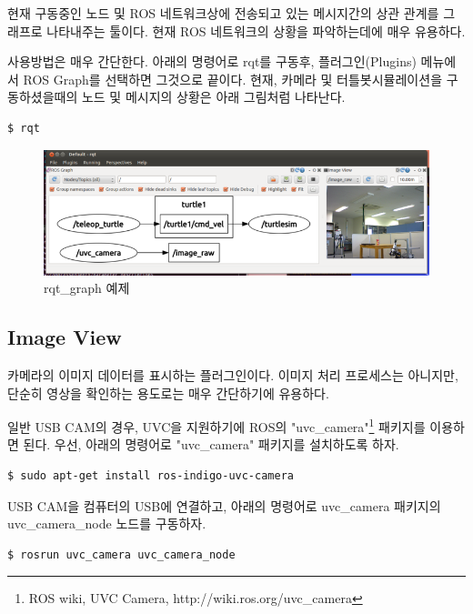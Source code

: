 현재 구동중인 노드 및 ROS 네트워크상에 전송되고 있는 메시지간의 상관 관계를 그래프로 나타내주는 툴이다. 현재 ROS 네트워크의 상황을 파악하는데에 매우 유용하다.

사용방법은 매우 간단한다. 아래의 명령어로 rqt를 구동후, 플러그인(Plugins) 메뉴에서 ROS Graph를 선택하면 그것으로 끝이다. 현재, 카메라 및 터틀봇시뮬레이션을 구동하셨을때의 노드 및 메시지의 상황은 아래 그림처럼 나타난다.

\vspace{\baselineskip}
\begin{lstlisting}[language=ROS]
$ rqt
\end{lstlisting}

\begin{figure}[h]
\centering\includegraphics[width=0.9\columnwidth]{pictures/chapter6/rqt_graph.png}
\caption{rqt\_graph 예제}
\end{figure}

\subsection{Image View}

카메라의 이미지 데이터를 표시하는 플러그인이다. 이미지 처리 프로세스는 아니지만, 단순히 영상을 확인하는 용도로는 매우 간단하기에 유용하다.

일반 USB CAM의 경우, UVC을 지원하기에 ROS의 "uvc\_camera"\footnote{ROS wiki, UVC Camera, http://wiki.ros.org/uvc\_camera} 패키지를 이용하면 된다. 우선, 아래의 명령어로 "uvc\_camera" 패키지를 설치하도록 하자.

\begin{lstlisting}[language=ROS]
$ sudo apt-get install ros-indigo-uvc-camera 
\end{lstlisting}

USB CAM을 컴퓨터의 USB에 연결하고, 아래의 명령어로 uvc\_camera 패키지의 uvc\_camera\_node 노드를 구동하자.

\begin{lstlisting}[language=ROS]
$ rosrun uvc_camera uvc_camera_node
\end{lstlisting}

